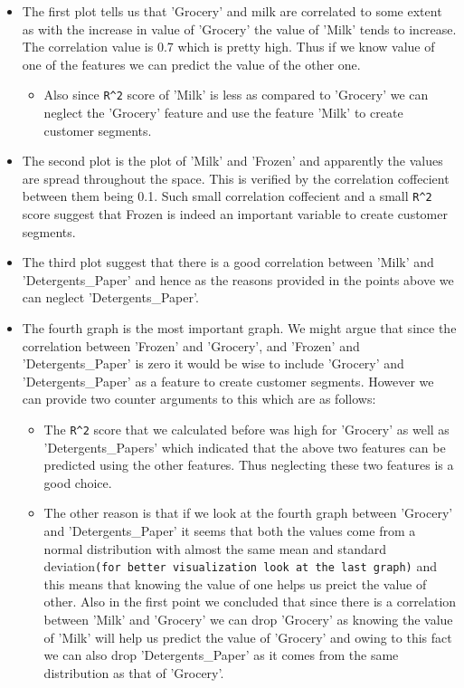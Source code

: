 \documentclass[11pt]{article}
\providecommand{\tightlist}{%
      \setlength{\itemsep}{0pt}\setlength{\parskip}{0pt}}
\begin{document}
    \begin{itemize}
\item
  The first plot tells us that 'Grocery' and milk are correlated to some
  extent as with the increase in value of 'Grocery' the value of 'Milk'
  tends to increase. The correlation value is 0.7 which is pretty high.
  Thus if we know value of one of the features we can predict the value
  of the other one.

  \begin{itemize}
  \tightlist
  \item
    Also since \texttt{R\^{}2} score of 'Milk' is less as compared to
    'Grocery' we can neglect the 'Grocery' feature and use the feature
    'Milk' to create customer segments.
  \end{itemize}
\item
  The second plot is the plot of 'Milk' and 'Frozen' and apparently the
  values are spread throughout the space. This is verified by the
  correlation coffecient between them being 0.1. Such small correlation
  coffecient and a small \texttt{R\^{}2} score suggest that Frozen is
  indeed an important variable to create customer segments.
\item
  The third plot suggest that there is a good correlation between 'Milk'
  and 'Detergents\_Paper' and hence as the reasons provided in the
  points above we can neglect 'Detergents\_Paper'.
\item
  The fourth graph is the most important graph. We might argue that
  since the correlation between 'Frozen' and 'Grocery', and 'Frozen' and
  'Detergents\_Paper' is zero it would be wise to include 'Grocery' and
  'Detergents\_Paper' as a feature to create customer segments. However
  we can provide two counter arguments to this which are as follows:

  \begin{itemize}
  \tightlist
  \item
    The \texttt{R\^{}2} score that we calculated before was high for
    'Grocery' as well as 'Detergents\_Papers' which indicated that the
    above two features can be predicted using the other features. Thus
    neglecting these two features is a good choice.
  \item
    The other reason is that if we look at the fourth graph between
    'Grocery' and 'Detergents\_Paper' it seems that both the values come
    from a normal distribution with almost the same mean and standard
    deviation\texttt{(for\ better\ visualization\ look\ at\ the\ last\ graph)}
    and this means that knowing the value of one helps us preict the
    value of other. Also in the first point we concluded that since
    there is a correlation between 'Milk' and 'Grocery' we can drop
    'Grocery' as knowing the value of 'Milk' will help us predict the
    value of 'Grocery' and owing to this fact we can also drop
    'Detergents\_Paper' as it comes from the same distribution as that
    of 'Grocery'.
  \end{itemize}
\end{itemize}
\end{document}
